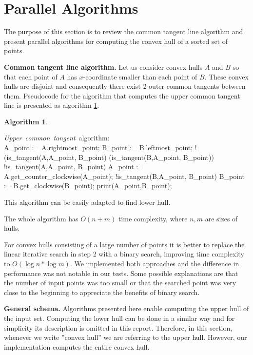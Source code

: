 \documentclass[letterpaper]{article}
\newcommand{\mypar}[1]{{\bf #1.}}
\theoremstyle{definition}
\newtheorem{algorithm}{Algorithm}
\begin{document}
\section{Parallel Algorithms}

The purpose of this section is to review the common tangent line algorithm and present parallel algorithms for computing the convex hull of a sorted set of points.

\mypar{Common tangent line algorithm}
Let us consider convex hulls $A$ and $B$ so that each point of $A$ has $x$-coordinate smaller than each point of $B$. 
These convex hulls are disjoint and consequently there exist 2 outer common tangents between them. 
Pseudocode for the algorithm that computes the upper common tangent line is presented as algorithm \ref{alg:common-tangent}.

\begin{algorithm}
\label{alg:common-tangent}
\begin{program}
\mbox{{\it Upper common tangent} algorithm:}
\BEGIN \\ %
  A\_point := A.rightmost\_point;
  B\_point := B.leftmost\_point;
\WHILE !(is\_tangent(A,A\_point, B\_point) \AND 
 (is\_tangent(B,A\_point, B\_point)) \DO
	  \WHILE !is\_tangent(A,A\_point, B\_point) \DO
		A\_point :=
		\;\;\;\;A.get\_counter\_clockwise(A\_point);
	  \OD 
	  \WHILE !is\_tangent(B,A\_point, B\_point) \DO
		B\_point := B.get\_clockwise(B\_point);
	  \OD  
 \OD
 print(A\_point,B\_point);
\END
\end{program}
\end{algorithm}

This algorithm can be easily adapted to find lower hull.

The whole algorithm has $O(n+m)$ time complexity, where $n,m$ are sizes of hulls. 

For convex hulls consisting of a large number of points it is better to replace the linear iterative search in step 2 with a binary search, improving time complexity to $O(\log n*\log m)$.
We implemented both approaches and the difference in performance was not notable in our tests.
Some possible explanations are that the number of input points was too small or that the searched point was very close to the beginning to appreciate the benefits of binary search.

\mypar{General schema}
Algorithms presented here enable computing the upper hull of the input set. 
Computing the lower hull can be done in a similar way and for simplicity its description is omitted in this report. 
Therefore, in this section, whenever we write ''convex hull'' we are referring to the upper hull.
However, our implementation computes the entire convex hull.
\end{document}
